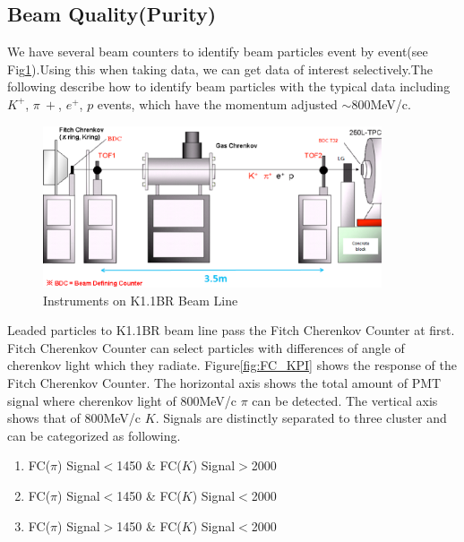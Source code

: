 \subsection{Beam Quality(Purity)}

We have several beam counters to identify beam particles event by event(see Fig\ref{fig:Beamline}).Using this when taking data, we can get data of interest selectively.The following describe how to identify beam particles with the typical data including $K^{+}$, $\pi~{+}$, $e^{+}$, $p$ events, which have the momentum adjusted $\sim$800MeV/c.\\

\begin{figure}[htbp]
  \centering
  \includegraphics[width=10cm,clip]{fig/Beamline.eps}
  \caption{Instruments on K1.1BR Beam Line}
  \label{fig:Beamline}
\end{figure}

Leaded particles to K1.1BR beam line pass the Fitch Cherenkov Counter at first.
Fitch Cherenkov Counter can select particles with differences of angle of cherenkov light which they radiate.
Figure\ref{fig:FC_KPI} shows the response of the Fitch Cherenkov Counter.
The horizontal axis shows the total amount of PMT signal where cherenkov light of 800MeV/c $\pi$ can be detected.
The vertical axis shows that of 800MeV/c $K$.
Signals are distinctly separated to three cluster and can be categorized as following.\\

\begin{enumerate}
\item FC($\pi$) Signal$<$1450 \& FC($K$) Signal$>$2000 \\
\item FC($\pi$) Signal$<$1450 \& FC($K$) Signal$<$2000 \\
\item FC($\pi$) Signal$>$1450 \& FC($K$) Signal$<$2000 \\
\end{enumerate}

